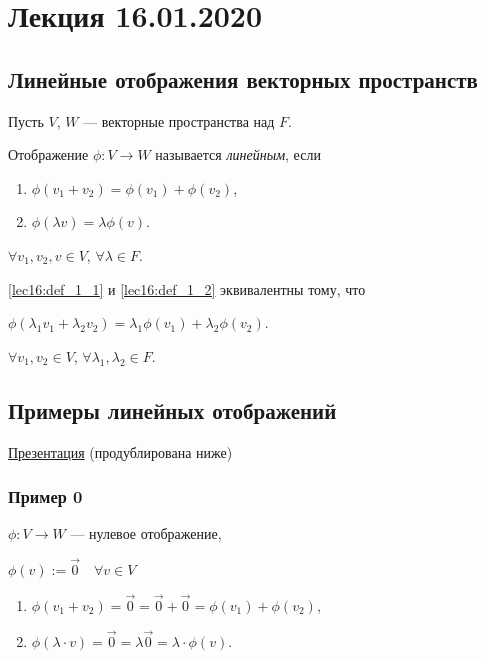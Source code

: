 \section{Лекция 16.01.2020}

\subsection{Линейные отображения векторных пространств}

Пусть $V$, $W$ --- векторные пространства над $F$.

\begin{definition}
    Отображение $\phi \colon V \to W$ называется \textit{линейным}, если
    \begin{enumerate}
    \item \label{lec16:def_1_1}$\phi(v_1 + v_2) = \phi(v_1) + \phi(v_2)$,
    \item \label{lec16:def_1_2} $\phi(\lambda v) = \lambda \phi(v)$.
    \end{enumerate}

    $\forall v_1, v_2, v \in V$, $\forall \lambda \in F$.
\end{definition}

\begin{exercise}
    \ref{lec16:def_1_1} и \ref{lec16:def_1_2} эквивалентны тому, что 

    $\phi(\lambda_1 v_1 + \lambda_2 v_2) = \lambda_1 \phi(v_1) + \lambda_2 \phi(v_2)$.

    $\forall v_1, v_2 \in V$, $\forall \lambda_1, \lambda_2 \in F$.
\end{exercise}

\subsection{Примеры линейных отображений}

\href{https://www.dropbox.com/s/t2or1ihptvg7xe6/LM_examples.pdf?dl=0}{Презентация} (продублирована ниже)

\subsubsection{Пример 0}

$\phi\colon V \to W$ --- нулевое отображение,

$\phi(v) := \overrightarrow{0} \quad \forall v \in V$

\bigskip
\begin{enumerate}[label=\arabic*), nosep]
\item $\phi(v_1 + v_2) = \overrightarrow{0} = \overrightarrow{0} + \overrightarrow{0} = \phi(v_1) + \phi(v_2)$,
\item $\phi(\lambda \cdot v) = \overrightarrow{0} = \lambda \overrightarrow{0} = \lambda \cdot \phi(v)$.
\end{enumerate}

